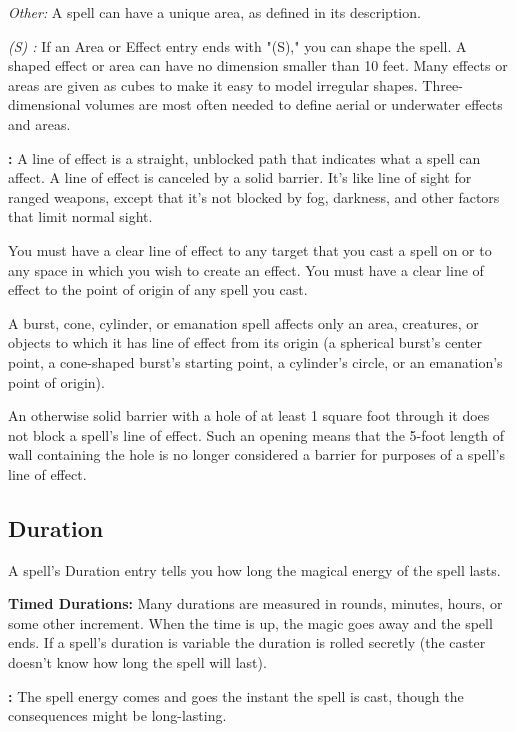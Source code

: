 \textit{Other:} A spell can have a unique area, as defined in its description.

\textit{(S) :} If an Area or Effect entry ends with "(S)," you can shape 
the spell. A shaped effect or area can have no dimension smaller than 10 feet. 
Many effects or areas are given as cubes to make it easy to model irregular shapes. 
Three-dimensional volumes are most often needed to define aerial or underwater 
effects and areas.

\textbf{:} A line of effect is a straight, unblocked path that indicates 
what a spell can affect. A line of effect is canceled by a solid barrier. It's 
like line of sight for ranged weapons, except that it's not blocked by fog, darkness, 
and other factors that limit normal sight.

You must have a clear line of effect to any target that you cast a spell on or 
to any space in which you wish to create an effect. You must have a clear line 
of effect to the point of origin of any spell you cast.

A burst, cone, cylinder, or emanation spell affects only an area, creatures, or 
objects to which it has line of effect from its origin (a spherical burst's center 
point, a cone-shaped burst's starting point, a cylinder's circle, or an emanation's 
point of origin).

An otherwise solid barrier with a hole of at least 1 square foot through it does 
not block a spell's line of effect. Such an opening means that the 5-foot length 
of wall containing the hole is no longer considered a barrier for purposes of a 
spell's line of effect.

\subsection{Duration}

A spell's Duration entry tells you how long the magical energy of the spell lasts.

\textbf{Timed Durations:} Many durations are measured in rounds, minutes, hours, 
or some other increment. When the time is up, the magic goes away and the spell 
ends. If a spell's duration is variable the duration is rolled secretly (the caster 
doesn't know how long the spell will last). 

\textbf{:} The spell energy comes and goes the instant the spell is 
cast, though the consequences might be long-lasting.

